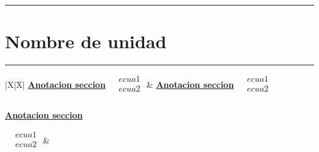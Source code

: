 \documentclass[../main.tex]{subfiles}
\begin{document}
\vspace{0.2in}
\hrule
\vspace{0.2in}
\section{Nombre de unidad}
\vspace{0.1in}
\hrule
\begin{xltabular}{\textwidth}{|X|X|}
  \hline
  \underline{\textbf{Anotacion seccion}}
  \newline\newline
  $\begin{aligned}
       & ecua1 \\
       & ecua2 \\
    \end{aligned}$
  \newline\newline
  &
  \underline{\textbf{Anotacion seccion}}
  \newline\newline
  $\begin{aligned}
       & ecua1 \\
       & ecua2 \\
    \end{aligned}$
  \newline\newline
  \\
  \hline
  \\
  \hline
  \underline{\textbf{Anotacion seccion}}

  $\begin{aligned}
       & ecua1 \\
       & ecua2 \\
    \end{aligned}$
  \newline\newline
  &
   \\
  \hline
\end{xltabular}
\end{document}
